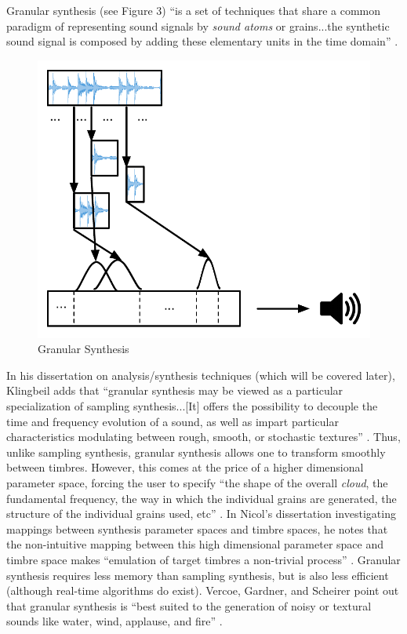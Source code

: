 \documentclass[12pt]{report} 	%
\numberwithin{figure}{chapter}
\numberwithin{table}{chapter}
\numberwithin{equation}{chapter}
\begin{document}
\begin{flushleft}
Granular synthesis (see Figure 3) ``is a set of techniques that share a common paradigm of representing sound signals by \textit{sound atoms} or grains...the synthetic sound signal is composed by adding these elementary units in the time domain'' \cite[p.13]{Tolonen:1998bh}. 
\begin{figure}[h!]
\begin{center}
\includegraphics[scale=0.8]{GranularSynthesis}
\caption[Granular synthesis]{Granular Synthesis}
\end{center}
\vspace{6pt}
\end{figure}
In his dissertation on analysis/synthesis techniques (which will be covered later), Klingbeil adds that ``granular synthesis may be viewed as a particular specialization of sampling synthesis...[It] offers the possibility to decouple the time and frequency evolution of a sound, as well as impart particular characteristics modulating between rough, smooth, or stochastic textures'' \cite[p. 6]{Klingbeil:2009lo}. Thus, unlike sampling synthesis, granular synthesis allows one to transform smoothly between timbres. However, this comes at the price of a higher dimensional parameter space, forcing the user to specify ``the shape of the overall \textit{cloud}, the fundamental frequency, the way in which the individual grains are generated, the structure of the individual grains used, etc'' \cite[p. 5]{Johnson:1998sh}. In Nicol's dissertation investigating mappings between synthesis parameter spaces and timbre spaces, he notes that the non-intuitive mapping between this high dimensional parameter space and timbre space makes ``emulation of target timbres a non-trivial process'' \cite[p. 49]{Nicol:2005rp}. Granular synthesis requires less memory than sampling synthesis, but is also less efficient (although real-time algorithms do exist). Vercoe, Gardner, and Scheirer point out that granular synthesis is ``best suited to the generation of noisy or textural sounds like water, wind, applause, and fire'' \cite[p. 6]{Vercoe:1998hh}.


\end{flushleft}
\end{document}
